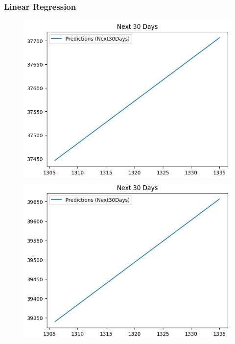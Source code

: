 \subsubsection{Linear Regression}
\begin{figure}[H]
    \centering
    \begin{minipage}{0.15\textwidth}
    \centering
    \includegraphics[width=1\textwidth]{resources/chapter-5/newdata/predicted/BIDV_LinearRegression_7-3 30 DAYS.png}
    \end{minipage}
    \hfill
    \begin{minipage}{0.15\textwidth}
    \centering
    \includegraphics[width=1\textwidth]{resources/chapter-5/newdata/predicted/BIDV_LinearRegression_8-2 30 DAYS.png}

\end{minipage}
\end{figure}
